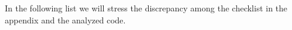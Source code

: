 \documentclass{scrreprt}
\begin{document}
\begin{comment}
\item [line 266] is longer than 80 characters and also longer than 120: it is 123;
\item [line 267] is longer than 80 characters: it is 108;
\item [line 268] is longer than 80 characters: it is 113;
\item [line 269] is longer than 80 characters and also longer than 120: it is 156;
\item [line 270] is longer than 80 characters and also longer than 120: it is 138;
\item [line 272] is longer than 80 characters: it is 123;
\item [line 272] the \texttt{+} is not preceded with whitespace;
\item [line 284]is longer than 80 characters: it is 100;
\item [line 284] the \texttt{+} is not preceded with whitespace;
\item [line 287] is longer than 80 characters and also longer than 120: it is 137;
\item [line 287] the \texttt{+} is not preceded with whitespace;
\item [line 288] is longer than 80 characters and also longer than 120: it is 186;
\item [line 289] is longer than 80 characters and also longer than 120: it is 166;

\end{itemize}

\end{comment}

In the following list we will stress the discrepancy among the checklist in the appendix and the analyzed code.
\end{document}
